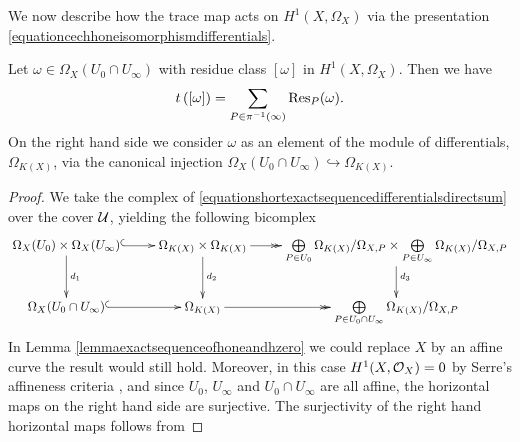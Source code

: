 We now describe how the trace map acts on $H^1(X,\Omega_X)$ via the presentation \eqref{equationcechhoneisomorphismdifferentials}.
    \begin{lem}\label{lemmatracemaplemma}
    Let $ \omega \in \Omega_X(U_0 \cap U_\infty)$ with residue class $[\omega]$ in $H^1(X,\Omega_X)$.
    Then we have
        \[
        t\left([ \omega ]\right) = \sum_{P \in \pi^{-1}(\infty)}\operatorname{Res}_P(\omega).
        \]
    On the right hand side we consider $\omega$ as an element of the module of differentials, $\Omega_{K(X)}$, via the canonical injection $\Omega_X(U_0 \cap U_\infty) \hookrightarrow \Omega_{K(X)}$.
    \end{lem}
    \begin{proof}
    We take the \cech complex of \eqref{equationshortexactsequencedifferentialsdirectsum} over the cover ${\mathcal U}$, yielding the following bicomplex
        \begin{equation}\label{equationdualitycommutativediagramdifferentials}
        \xymatrix{\Omega_X(U_0)\times\Omega_X(U_\infty) \ar@{^{(}->}[r] \ar[d]^{d_1} & \Omega_{K(X)} \times \Omega_{K(X)} \ar[d]^{d_2} \ar@{->>}[r] & \bigoplus \limits_{P \in U_0} \Omega_{K(X)}/\Omega_{X,P} \times \bigoplus \limits_{P \in U_\infty} \Omega_{K(X)}/\Omega_{X,P} \ar[d]^{d_3} \\
        \Omega_X(U_0 \cap U_\infty) \ar@{^{(}->}[r]  & \Omega_{K(X)} \ar@{->>}[r] & \bigoplus \limits_{P\in U_0 \cap U_\infty} \Omega_{K(X)}/\Omega_{X,P} }
        \end{equation}
    In Lemma \ref{lemmaexactsequenceofhoneandhzero} we could replace $X$ by an affine curve the result would still hold.
    Moreover, in this case $H^1(X,\mathcal{O}_X) = 0$ by Serre's affineness criteria \cite[Thm.\ 5.2.23]{liu}, and since $U_0$, $U_\infty$ and $U_0 \cap U_\infty$ are all affine, the horizontal maps on the right hand side are surjective.
    The surjectivity of the right hand horizontal maps follows from 


\end{proof}
